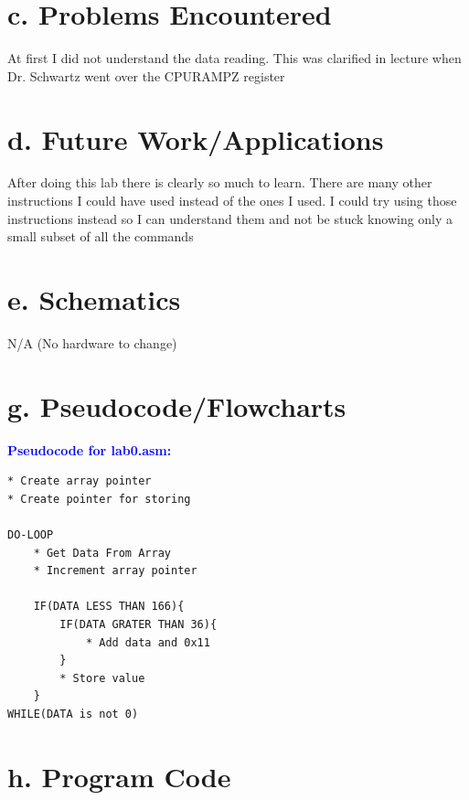 \documentclass[11pt]{article}
\theoremstyle{plain}
\theoremstyle{definition}
\begin{document}
\begin{enumerate}[label={\arabic*)},font={\color{red}\bfseries}]
	 
	
\end{enumerate}
\section*{c. Problems Encountered}
At first I did not understand the data reading. This was clarified in lecture when Dr. Schwartz went over the CPU\textunderscore RAMPZ register
\section*{d. Future Work/Applications}
After doing this lab there is clearly so much to learn. There are many other instructions I could have used instead of the ones I used. I could try using those instructions instead so I can understand them and not be stuck knowing only a small subset of all the commands
\section*{e. Schematics}
N/A (No hardware to change)
\section*{g. Pseudocode/Flowcharts}
\textbf{\textcolor{blue}{Pseudocode for lab0.asm:}}
\begin{tcolorbox}
\begin{verbatim}
* Create array pointer 
* Create pointer for storing

DO-LOOP
    * Get Data From Array
    * Increment array pointer 

    IF(DATA LESS THAN 166){
        IF(DATA GRATER THAN 36){
            * Add data and 0x11
        }
        * Store value
    }
WHILE(DATA is not 0)

\end{verbatim}
\end{tcolorbox}
\section*{h. Program Code}

\end{document}
